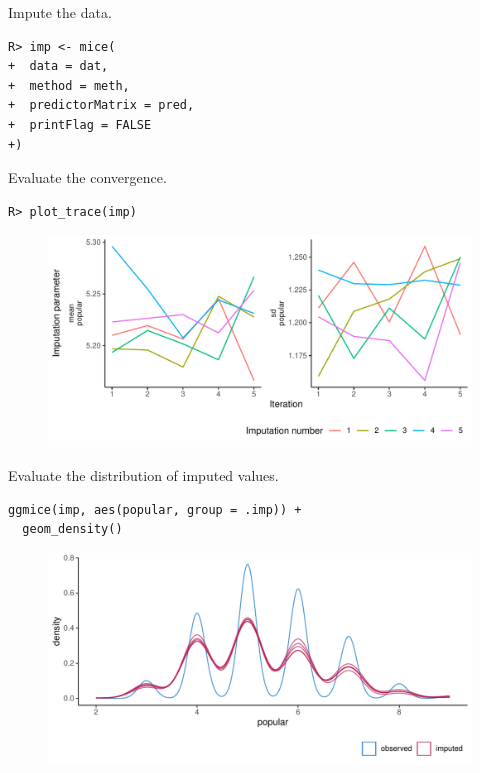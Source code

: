 \documentclass[
  article]{jss}
\begin{document}
Impute the data.

\begin{verbatim}
R> imp <- mice(
+  data = dat,
+  method = meth,
+  predictorMatrix = pred,
+  printFlag = FALSE
+)
\end{verbatim}

Evaluate the convergence.

\begin{verbatim}
R> plot_trace(imp)
\end{verbatim}

\begin{figure}[t]

{\centering \includegraphics{manuscript_files/figure-pdf/unnamed-chunk-14-1.pdf}

}

\end{figure}

Evaluate the distribution of imputed values.

\begin{verbatim}
ggmice(imp, aes(popular, group = .imp)) + 
  geom_density() 
\end{verbatim}

\begin{figure}[t]

{\centering \includegraphics{manuscript_files/figure-pdf/unnamed-chunk-15-1.pdf}

}

\end{figure}
\end{document}
